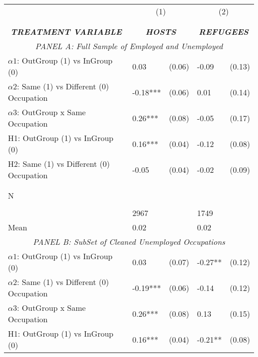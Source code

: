\begin{tabular}{l*{4}{l}} \toprule 
                &\multicolumn{2}{c}{(1)}&\multicolumn{2}{c}{(2)}\\
                &\multicolumn{2}{c}{ } &\multicolumn{2}{c}{ } \\
\\[-0.6cm] \multicolumn{1}{c}{\textit{\textbf{TREATMENT VARIABLE}}} & \multicolumn{2}{c}{\textit{\textbf{HOSTS}}} & \multicolumn{2}{c}{\textit{\textbf{REFUGEES}}} \\  \multicolumn{5}{c}{\textit{PANEL A: Full Sample of Employed and Unemployed}} \\  \midrule 
$\alpha1$: OutGroup (1) vs InGroup (0)&     0.03   &   (0.06)&    -0.09   &   (0.13)\\
$\alpha2$: Same (1) vs Different (0) Occupation&    -0.18***&   (0.06)&     0.01   &   (0.14)\\
 
$\alpha3$: OutGroup x Same Occupation&     0.26***&   (0.08)&    -0.05   &   (0.17)\\
 
H1: OutGroup (1) vs InGroup (0)&     0.16***&   (0.04)&    -0.12   &   (0.08)\\
 
H2: Same (1) vs Different (0) Occupation&    -0.05   &   (0.04)&    -0.02   &   (0.09)\\
 
\\\\[-0.5cm] N \\\\[-0.6cm]&     2967   &         &     1749   &         \\
Mean            &     0.02&         &     0.02&         \\
 
  \multicolumn{5}{c}{\textit{PANEL B: SubSet of Cleaned Unemployed Occupations}} \\  \midrule 
$\alpha1$: OutGroup (1) vs InGroup (0)&        0.03   &      (0.07)&       -0.27** &      (0.12)\\
$\alpha2$: Same (1) vs Different (0) Occupation&       -0.19***&      (0.06)&       -0.14   &      (0.12)\\
 
$\alpha3$: OutGroup x Same Occupation&     0.26***&   (0.08)&     0.13   &   (0.15)\\
 
H1: OutGroup (1) vs InGroup (0)&     0.16***&   (0.04)&    -0.21** &   (0.08)\\
 

\end{tabular}
